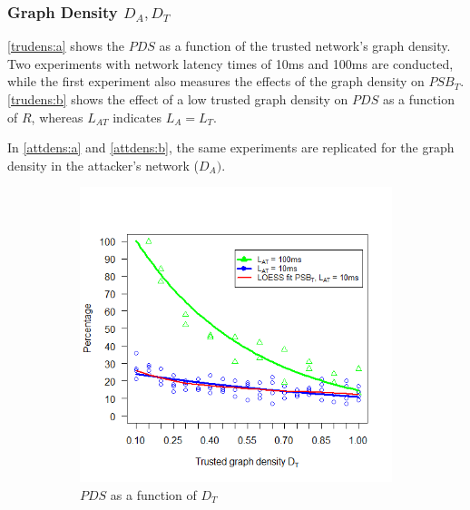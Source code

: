 \documentclass[a4paper,12pt,twoside]{report}
\begin{document}
\subsubsection{Graph Density $D_{A},D_T$}
\autoref{trudens:a} shows the $PDS$ as a function of the trusted network's graph density. Two experiments with network latency times of 10ms and 100ms are conducted, while the first experiment also measures the effects of the graph density on $PSB_T$. \autoref{trudens:b} shows the effect of a low trusted graph density on $PDS$ as a function of $R$, whereas $L_{AT}$ indicates $L_{A} = L_{T}$.

In \autoref{attdens:a} and \autoref{attdens:b}, the same experiments are replicated for the graph density in the attacker's network ($D_{A})$.

\begin{figure}[!ht]
\centering
\begin{subfigure}{.5\textwidth}
  \centering
  \includegraphics[width=\linewidth]{Experiments/TruDensity/trudens.png}
  \caption{$PDS$ as a function of $D_{T}$}
  \label{trudens:a}
\end{subfigure}%
\begin{subfigure}{.5\textwidth}
  \centering

\end{subfigure}
\end{figure}
\end{document}
